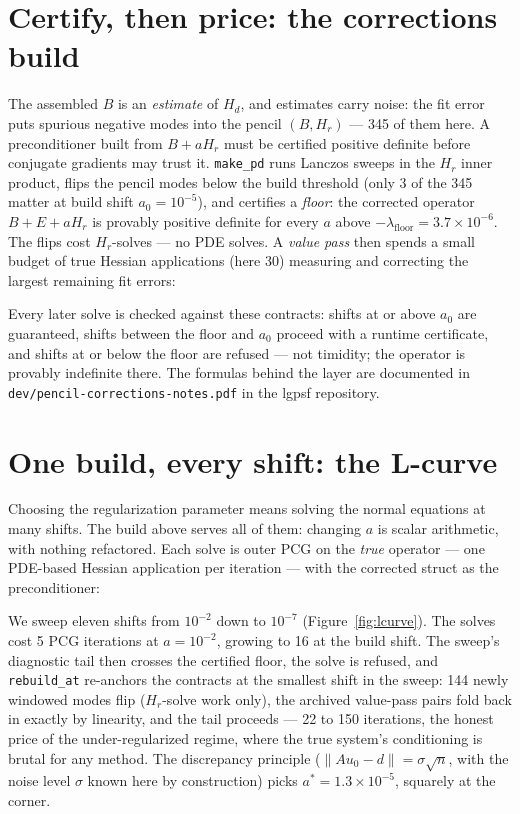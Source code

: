 \documentclass[11pt]{article}
\newcommand{\Hd}{H_d}
\newcommand{\Hr}{H_r}
\begin{document}
\section{Certify, then price: the corrections build}
\label{sec:build}

The assembled $B$ is an \emph{estimate} of $\Hd$, and estimates carry
noise: the fit error puts spurious negative modes into the pencil
$(B, \Hr)$ --- 345 of them here. A preconditioner built from $B + a\Hr$
must be certified positive definite before conjugate gradients may
trust it. \texttt{make\_pd} runs Lanczos sweeps in the $\Hr$ inner
product, flips the pencil modes below the build threshold (only 3 of
the 345 matter at build shift $a_0 = 10^{-5}$), and certifies a
\emph{floor}: the corrected operator $B + E + a\Hr$ is provably
positive definite for every $a$ above $-\lambda_{\mathrm{floor}} =
3.7\times 10^{-6}$. The flips cost $\Hr$-solves --- no PDE solves. A
\emph{value pass} then spends a small budget of true Hessian
applications (here 30) measuring and correcting the largest remaining
fit errors:

{\small}

Every later solve is checked against these contracts: shifts at or
above $a_0$ are guaranteed, shifts between the floor and $a_0$ proceed
with a runtime certificate, and shifts at or below the floor are
refused --- not timidity; the operator is provably indefinite there.
The formulas behind the layer are documented in
\texttt{dev/pencil-corrections-notes.pdf} in the lgpsf repository.

\section{One build, every shift: the L-curve}
\label{sec:lcurve}

Choosing the regularization parameter means solving the normal
equations at many shifts. The build above serves all of them: changing
$a$ is scalar arithmetic, with nothing refactored. Each solve is outer
PCG on the \emph{true} operator --- one PDE-based Hessian application
per iteration --- with the corrected struct as the preconditioner:

{\small}

We sweep eleven shifts from $10^{-2}$ down to $10^{-7}$
(Figure~\ref{fig:lcurve}). The solves cost 5 PCG iterations at
$a = 10^{-2}$, growing to 16 at the build shift. The sweep's diagnostic
tail then crosses the certified floor, the solve is refused, and
\texttt{rebuild\_at} re-anchors the contracts at the smallest shift in
the sweep: 144 newly windowed modes flip ($\Hr$-solve work only), the
archived value-pass pairs fold back in exactly by linearity, and the
tail proceeds --- 22 to 150 iterations, the honest price of the
under-regularized regime, where the true system's conditioning is
brutal for any method. The discrepancy principle
($\|A u_0 - d\| = \sigma\sqrt{n}$, with the noise level $\sigma$ known
here by construction) picks $a^\ast = 1.3\times 10^{-5}$, squarely at
the corner.
\end{document}
